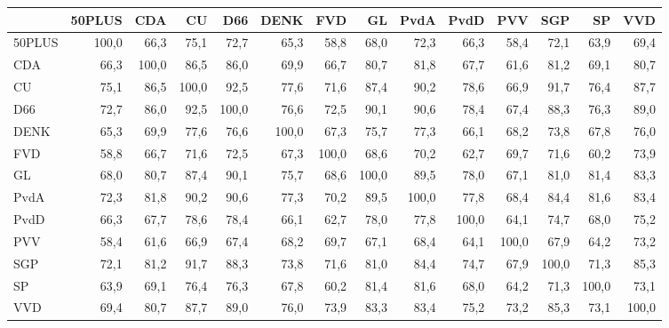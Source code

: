 \begin{tabular}{lrrrrrrrrrrrrr}
\toprule
{} &  50PLUS &    CDA &     CU &    D66 &   DENK &    FVD &     GL &   PvdA &   PvdD &    PVV &    SGP &     SP &    VVD \\
\midrule
50PLUS &   100,0 &   66,3 &   75,1 &   72,7 &   65,3 &   58,8 &   68,0 &   72,3 &   66,3 &   58,4 &   72,1 &   63,9 &   69,4 \\
CDA    &    66,3 &  100,0 &   86,5 &   86,0 &   69,9 &   66,7 &   80,7 &   81,8 &   67,7 &   61,6 &   81,2 &   69,1 &   80,7 \\
CU     &    75,1 &   86,5 &  100,0 &   92,5 &   77,6 &   71,6 &   87,4 &   90,2 &   78,6 &   66,9 &   91,7 &   76,4 &   87,7 \\
D66    &    72,7 &   86,0 &   92,5 &  100,0 &   76,6 &   72,5 &   90,1 &   90,6 &   78,4 &   67,4 &   88,3 &   76,3 &   89,0 \\
DENK   &    65,3 &   69,9 &   77,6 &   76,6 &  100,0 &   67,3 &   75,7 &   77,3 &   66,1 &   68,2 &   73,8 &   67,8 &   76,0 \\
FVD    &    58,8 &   66,7 &   71,6 &   72,5 &   67,3 &  100,0 &   68,6 &   70,2 &   62,7 &   69,7 &   71,6 &   60,2 &   73,9 \\
GL     &    68,0 &   80,7 &   87,4 &   90,1 &   75,7 &   68,6 &  100,0 &   89,5 &   78,0 &   67,1 &   81,0 &   81,4 &   83,3 \\
PvdA   &    72,3 &   81,8 &   90,2 &   90,6 &   77,3 &   70,2 &   89,5 &  100,0 &   77,8 &   68,4 &   84,4 &   81,6 &   83,4 \\
PvdD   &    66,3 &   67,7 &   78,6 &   78,4 &   66,1 &   62,7 &   78,0 &   77,8 &  100,0 &   64,1 &   74,7 &   68,0 &   75,2 \\
PVV    &    58,4 &   61,6 &   66,9 &   67,4 &   68,2 &   69,7 &   67,1 &   68,4 &   64,1 &  100,0 &   67,9 &   64,2 &   73,2 \\
SGP    &    72,1 &   81,2 &   91,7 &   88,3 &   73,8 &   71,6 &   81,0 &   84,4 &   74,7 &   67,9 &  100,0 &   71,3 &   85,3 \\
SP     &    63,9 &   69,1 &   76,4 &   76,3 &   67,8 &   60,2 &   81,4 &   81,6 &   68,0 &   64,2 &   71,3 &  100,0 &   73,1 \\
VVD    &    69,4 &   80,7 &   87,7 &   89,0 &   76,0 &   73,9 &   83,3 &   83,4 &   75,2 &   73,2 &   85,3 &   73,1 &  100,0 \\
\bottomrule
\end{tabular}

